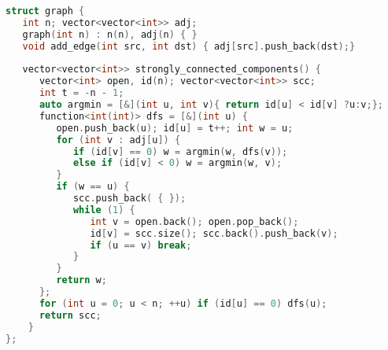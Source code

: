 \begin{lstlisting}[language=C++]
struct graph {
   int n; vector<vector<int>> adj;
   graph(int n) : n(n), adj(n) { }
   void add_edge(int src, int dst) { adj[src].push_back(dst);}
	
   vector<vector<int>> strongly_connected_components() {
      vector<int> open, id(n); vector<vector<int>> scc;
      int t = -n - 1;
      auto argmin = [&](int u, int v){ return id[u] < id[v] ?u:v;};
      function<int(int)> dfs = [&](int u) {
         open.push_back(u); id[u] = t++; int w = u;
         for (int v : adj[u]) {
            if (id[v] == 0) w = argmin(w, dfs(v));
            else if (id[v] < 0) w = argmin(w, v);
         }
         if (w == u) {
            scc.push_back( { });
            while (1) {
               int v = open.back(); open.pop_back();
               id[v] = scc.size(); scc.back().push_back(v);
               if (u == v) break;
            }
         }
         return w;
      };
      for (int u = 0; u < n; ++u) if (id[u] == 0) dfs(u);
      return scc;
	}
};
\end{lstlisting}